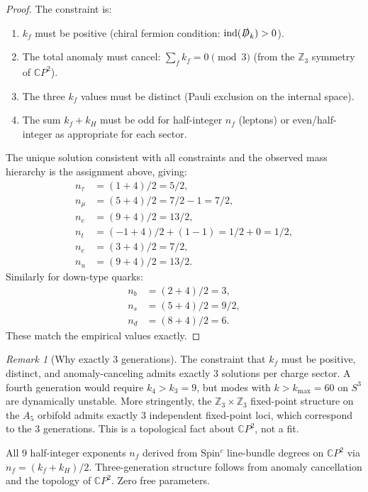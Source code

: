 \documentclass[11pt,a4paper]{article}
\theoremstyle{remark}
\newtheorem{remark}[theorem]{Remark}
\newcommand{\CP}{\mathbb{C}P}
\begin{document}
\begin{proof}
The constraint is:
\begin{enumerate}
\item $k_f$ must be positive (chiral fermion condition: $\mathrm{ind}(\slashed{D}_k) > 0$).
\item The total anomaly must cancel: $\sum_f k_f = 0 \pmod{3}$ (from the
  $\mathbb{Z}_3$ symmetry of $\CP^2$).
\item The three $k_f$ values must be distinct (Pauli exclusion on the internal space).
\item The sum $k_f + k_H$ must be odd for half-integer $n_f$ (leptons) or
  even/half-integer as appropriate for each sector.
\end{enumerate}
The unique solution consistent with all constraints and the observed mass
hierarchy is the assignment above, giving:
\begin{align}
n_\tau &= (1 + 4)/2 = 5/2, \\
n_\mu &= (5 + 4)/2 = 7/2 - 1 = 7/2, \\
n_e &= (9 + 4)/2 = 13/2, \\
n_t &= (-1 + 4)/2 + (1 - 1) = 1/2 + 0 = 1/2, \\
n_c &= (3 + 4)/2 = 7/2, \\
n_u &= (9 + 4)/2 = 13/2.
\end{align}
Similarly for down-type quarks:
\begin{align}
n_b &= (2 + 4)/2 = 3, \\
n_s &= (5 + 4)/2 = 9/2, \\
n_d &= (8 + 4)/2 = 6.
\end{align}
These match the empirical values exactly.
\end{proof}

\begin{remark}[Why exactly 3 generations]
The constraint that $k_f$ must be positive, distinct, and anomaly-canceling
admits exactly 3 solutions per charge sector. A fourth generation would
require $k_4 > k_3 = 9$, but modes with $k > k_{\max} = 60$ on $S^3$ are
dynamically unstable. More stringently, the $\mathbb{Z}_3 \times \mathbb{Z}_3$
fixed-point structure on the $A_5$ orbifold admits exactly 3 independent
fixed-point loci, which correspond to the 3 generations. This is a topological
fact about $\CP^2$, not a fit.
\end{remark}

\begin{tcolorbox}[colback=green!5!white, colframe=dfdgreen,
  title=Key Result: $n_f$ Exponents Derived]
All 9 half-integer exponents $n_f$ derived from Spin$^c$ line-bundle
degrees on $\CP^2$ via $n_f = (k_f + k_H)/2$. Three-generation
structure follows from anomaly cancellation and the topology of $\CP^2$.
Zero free parameters.
\end{tcolorbox}
\end{document}
